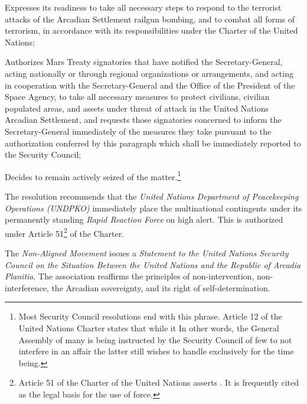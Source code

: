 \item Expresses its readiness to take all necessary steps to respond to the terrorist attacks of the Arcadian Settlement railgun bombing, and to combat all forms of terrorism, in accordance with its responsibilities under the Charter of the United Nations;

\item Authorizes Mars Treaty signatories that have notified the Secretary-General, acting nationally or through regional organizations or arrangements, and acting in cooperation with the Secretary-General and the Office of the President of the Space Agency, to take all necessary measures to protect civilians, civilian populated areas, and assets under threat of attack in the United Nations Arcadian Settlement, and requests those signatories concerned to inform the Secretary-General immediately of the measures they take pursuant to the authorization conferred by this paragraph which shall be immediately reported to the Security Council;

\item Decides to remain actively seized of the matter.\footnote{Most Security Council resolutions end with this phrase. Article 12 of the United Nations Charter states that while it  In other words, the General Assembly of many is being instructed by the Security Council of few to not interfere in an affair the latter still wishes to handle exclusively for the time being.}
\stopitemize
\stopTimelineGeneralDocument

The resolution recommends that the {\it United Nations Department of Peacekeeping Operations (UNDPKO)} immediately place the multinational contingents under its permanently standing {\it Rapid Reaction Force} on high alert. This is authorized under Article 51\footnote{Article 51 of the Charter of the United Nations asserts . It is frequently cited as the legal basis for the use of force.} of the Charter.
\StopTimelineDate

The {\it Non-Aligned Movement} issues a {\it Statement to the United Nations Security Council on the Situation Between the United Nations and the Republic of Arcadia Planitia}. The association reaffirms the principles of non-intervention, non-interference, the Arcadian sovereignty, and its right of self-determination.

